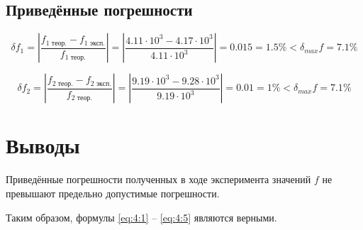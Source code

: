 \subsection{Приведённые погрешности}

\begin{displaymath}
	\delta f_1 = \left|\frac{f_\text{1 теор.} - f_\text{1 эксп.}}{f_\text{1 теор.}} \right| = \left|\frac{4.11 \cdot 10^3 - 4.17 \cdot 10^3}{4.11 \cdot 10^3}\right| = 0.015 = 1.5\% < \delta_{max} f = 7.1\%
\end{displaymath}

\begin{displaymath}
	\delta f_2 = \left|\frac{f_\text{2 теор.} - f_\text{2 эксп.}}{f_\text{2 теор.}} \right| = \left|\frac{9.19 \cdot 10^3 - 9.28 \cdot 10^3}{9.19 \cdot 10^3}\right| = 0.01 = 1\% < \delta_{max} f = 7.1\%
\end{displaymath}

\section{Выводы}

Приведённые погрешности полученных в ходе эксперимента значений $f$ не превышают предельно допустимые погрешности.

Таким образом, формулы \ref{eq:4:1} -- \ref{eq:4:5} являются верными.

